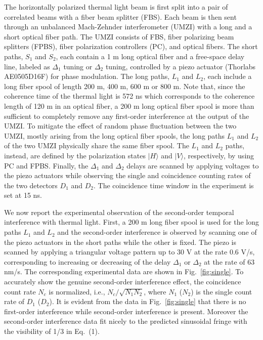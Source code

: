 \documentclass[aps,prl,reprint,showpacs,superscriptaddress]{revtex4-1}
\begin{document}
The horizontally polarized thermal light beam is first split into a pair of correlated beams with a fiber beam splitter (FBS). Each beam is then sent through an unbalanced Mach-Zehnder interferometer (UMZI) with a long and a short optical fiber path. The UMZI consists of FBS, fiber polarizing beam splitters (FPBS), fiber polarization controllers (PC), and optical fibers. The short paths, $S_1$ and $S_2$, each contain a 1 m long optical fiber and  a free-space delay line, labeled as $\Delta_1$ tuning or $\Delta_2$ tuning, controlled by a piezo actuator (Thorlabs AE0505D16F) for phase modulation. The long paths, $L_1$ and $L_2$, each include a long fiber spool of length 200 m, 400 m, 600 m or 800 m. Note that, since the coherence time of the thermal light is 572 ns which corresponds to the coherence length of 120 m in an optical fiber, a 200 m long optical fiber spool is more than sufficient to completely remove any first-order interference at the output of the UMZI. To mitigate the effect of random phase fluctuation between the two UMZI, mostly arising from the long optical fiber spools, the long paths $L_1$ and $L_2$ of the two UMZI  physically share the same fiber spool. The $L_1$ and $L_2$ paths, instead, are defined by the polarization states $|H\rangle$ and $|V\rangle$, respectively, by using PC and FPBS. Finally, the $\Delta_{1}$ and $\Delta_{2}$ delays are scanned by applying voltages to the piezo actuators while observing the single and coincidence counting rates of the two detectors $D_1$ and $D_2$. The coincidence time window in the experiment is set at 15 ns. 





We now report the experimental observation of the second-order temporal interference with thermal light. First, a 200 m long fiber spool is used for the long paths $L_1$ and $L_2$ and the second-order interference is observed by scanning one of the piezo actuators in the short paths while the other is fixed. The piezo is scanned by applying a triangular voltage pattern up to 30 V at the rate 0.6 V/s, corresponding to increasing or decreasing of the delay $\Delta_1$ or $\Delta_2$ at the rate of 63 nm/s. The corresponding experimental data are shown in Fig.~\ref{fig:single}. To accurately show the genuine second-order interference effect, the coincidence count rate $N_c$ is normalized, i.e., $N_c/\sqrt{N_1 N_2}$, where $N_1$ ($N_2$) is the single count rate of $D_1$ ($D_2$). It is evident from the data in Fig.~\ref{fig:single} that there is no first-order interference while second-order interference is present. Moreover the second-order interference data fit nicely to the predicted sinusoidal fringe with the visibility of 1/3 in Eq.~(1).  
\end{document}

